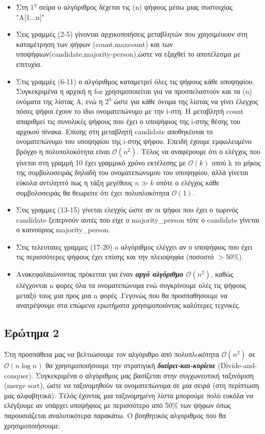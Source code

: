 \documentclass[a4paper]{article}
\begin{document}
\begin{itemize}
\item Στη $1^η$ σείρα ο αλγόριθμος δέχεται τις (n) ψήφους μέσω μιας συστοιχίας "A[1...n]"
\item Στις γραμμές (2-5) γίνονται αρχικοποιήσεις μεταβλητών που χρησιμέυουν στη καταμέτρηση των ψήφων (count,maxcount) και των υποψήφιων(candidate,majority-person),ώστε να εξαχθεί το αποτέλεσμα με επιτυχία.
\item Στις γραμμές (6-11) ο αλγόριθμος καταμετρεί όλες τις ψήφους κάθε υποψηφίου. Συγκεκριμένα η αρχική η for χρησιμοποιείται για να προσπελαστούν και τα (n) ονόματα της λίστας A, ενώ η $2^η$ ώστε για κάθε όνομα της λίστας να γίνει έλεγχος πόσες ψήφοι έχουν το ίδιο ονοματεπώνυμο με την i-στη. Η μεταβλητή  count απαριθμεί τις συνολικές ψήφους που έχει ο υποψήφιος της i-στης θέσης του αρχικού πίνακα. Επίσης στη μεταβλητή candidate αποθηκέυται το ονοματεπώνυμο του υποψηφίου της i-στης ψήφου. Επειδή έχουμε εμφωλευμένο βρόγχο η πολυπολοκότητα είναι $\mathcal{O}(n^2)$. Τέλος να αναφέρουμε ότι ο ελέγχος που γίνεται στη γραμμή 10 έχει γραμμικό χρόνο εκτέλεσης με $\mathcal{O}(k)$ οπού k το μήκος της συμβολοσειράς δηλαδή του ονοματεπώνυμου του υποψηφίου, αλλά γίνεται εύκολα αντιληπτό πως η τάξη μεγέθους $n\gg k$ οπότε ο ελέγχος κάθε συμβολοσειράς  θα θεωρείτε ότι έχει πολυπλοκότητα  $\mathcal{O}(1)$.
\item Στις γραμμες (13-15) γίνεται  ελεγχός ώστε αν οι ψήφοι που έχει ο τωρινός candidate ξεπερνούν αυτές που είχε ο majority\_person τότε ο candidate γίνεται ο καινούριος majority\_person. 
\item Στις τελευταιες γραμμες (17-20) o αλγόριθμος ελέγχει αν ο υποψήφιος που έχει τις περισσότερες ψήφους έχει επίσης και την πλειοψηφία (ποσοστό $>50\%$).
\item Aνακεφαλαιώνοντας πρόκειται για έναν \textit{\textbf{αργό αλγόριθμο $\mathcal{O}(n^2)$}}, καθώς ελέγχονται n φορες όλα τα ονοματεπώνυμα ενώ συγκρίνουμε ολές τις ψήφους μεταξύ τους μια προς μια n φορές .Γεγονώς που θα προσπαθήσουμε να ανατρέψουμε στα επώμενα ερωτήματα χρησιμοποιόντας καλύτερες τεχνικές.  
\end{itemize}
\newpage

\subsection*{\color{red}Ερώτημα 2}
Στη προσπάθεια μας να βελτιώσουμε τον αλγόριθμο από πολυπλoκότητα $\mathcal{O}(n^2)$ σε $\mathcal{O}(n\log{n})$ θα χρησιμοποιήσουμε την στρατιγική \textit{\textbf{διαίρει-και-κυρίευε}} (Divide-and-conquer). Συγκεκριμένα ο αλγόριθμος  μας βασίζεται στην συγχωνευτική ταξινόμιση (merge sort), ώστε να ταξινομηθούν τα ονοματεπώνυμα σε μια σειρά (στη περίπτωση μας αλφαβητικά). Τέλός έχοντας μια ταξινομημένη λίστα μπορούμε πολύ ευκόλα να ελέγξουμε αν υπάρχει υποψήφιος με περισσότερο από 50\% των ψήφων όπως παρουσιάζεται  αναλυτικότερα παρακάτω. Ο βοηθητικός αλγοριθμος που θα χρησιμοποιήσουμε:
         
\end{document}
